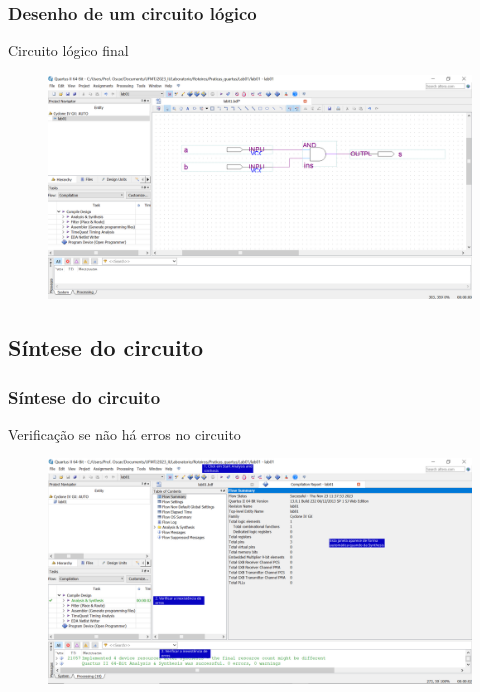 \documentclass{CPSPresentation}
\begin{document}
\begin{frame}
	\frametitle{Desenho de um circuito lógico}
	
	\begin{block}{}
		\justifying
		Circuito lógico final
	\end{block}
	
	
	\begin{figure}[h]
		\centering
		\includegraphics[width=1.02\textwidth]{quartus/fig21.png}
	\end{figure}
	
	
\end{frame}
\subsection{Síntese do circuito}

\begin{frame}
	\frametitle{Síntese do circuito}
	
	\begin{block}{}
		\justifying
		Verificação se não há erros no circuito
	\end{block}
	
	
	\begin{figure}[h]
		\centering
		\includegraphics[width=1.02\textwidth]{quartus/fig16.pdf}
	\end{figure}
	
	
\end{frame}
\end{document}
